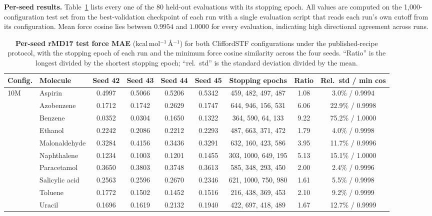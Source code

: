 \textbf{Per-seed results.} Table~\ref{tab:seeds} lists every one of the 80 held-out evaluations with its stopping epoch. All values are computed on the 1{,}000-configuration test set from the best-validation checkpoint of each run with a single evaluation script that reads each run's own cutoff from its configuration. Mean force cosine lies between $0.9954$ and $1.0000$ for every evaluation, indicating high directional agreement across runs.

\begin{table}[t]
\centering
\caption{\textbf{Per-seed rMD17 test force MAE} (kcal\,mol$^{-1}$\,\AA$^{-1}$) for both CliffordSTF configurations under the published-recipe protocol, with the stopping epoch of each run and the minimum force cosine similarity across the four seeds. ``Ratio'' is the longest divided by the shortest stopping epoch; ``rel.\ std'' is the standard deviation divided by the mean.}
\label{tab:seeds}
\footnotesize
\begin{tabular}{llccccccc}
\toprule
Config. & Molecule & Seed 42 & Seed 43 & Seed 44 & Seed 45 & Stopping epochs & Ratio & Rel.\ std / min cos \\
\midrule
10M & Aspirin & 0.4997 & 0.5066 & 0.5206 & 0.5342 & 459, 482, 497, 487 & 1.08 & 3.0\% / 0.9994 \\
 & Azobenzene & 0.1712 & 0.1742 & 0.2629 & 0.1747 & 644, 946, 156, 531 & 6.06 & 22.9\% / 0.9998 \\
 & Benzene & 0.0352 & 0.0304 & 0.1650 & 0.1322 & 364, 590, 64, 133 & 9.22 & 75.2\% / 1.0000 \\
 & Ethanol & 0.2242 & 0.2086 & 0.2212 & 0.2293 & 487, 663, 371, 472 & 1.79 & 4.0\% / 0.9998 \\
 & Malonaldehyde & 0.3284 & 0.4156 & 0.3436 & 0.3291 & 632, 160, 423, 586 & 3.95 & 11.7\% / 0.9996 \\
 & Naphthalene & 0.1234 & 0.1003 & 0.1201 & 0.1455 & 303, 1000, 649, 195 & 5.13 & 15.1\% / 1.0000 \\
 & Paracetamol & 0.3650 & 0.3803 & 0.3748 & 0.3613 & 585, 348, 293, 450 & 2.00 & 2.4\% / 0.9996 \\
 & Salicylic acid & 0.2563 & 0.2596 & 0.2670 & 0.2346 & 621, 1000, 750, 980 & 1.61 & 5.5\% / 0.9998 \\
 & Toluene & 0.1772 & 0.1502 & 0.1452 & 0.1516 & 216, 438, 369, 453 & 2.10 & 9.2\% / 0.9999 \\
 & Uracil & 0.1696 & 0.1619 & 0.2132 & 0.1940 & 422, 697, 418, 489 & 1.67 & 12.7\% / 0.9999 \\

\end{tabular}
\end{table}
